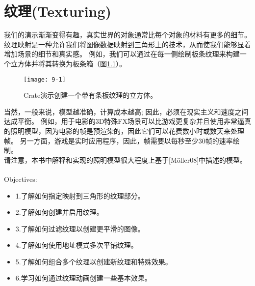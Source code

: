 \chapter{纹理(Texturing)}
\begin{flushleft}
我们的演示渐渐变得有趣，真实世界的对象通常比每个对象的材料有更多的细节。 纹理映射是一种允许我们将图像数据映射到三角形上的技术，从而使我们能够显着增加场景的细节和真实感。 例如，我们可以通过在每一侧绘制板条纹理来构建一个立方体并将其转换为板条箱（图\ref{fig:9-1}）。
\end{flushleft}

\begin{figure}[h]
    \texttt{[image: 9-1]}
    \centering
    \caption{Crate演示创建一个带有条板纹理的立方体。}
    \label{fig:9-1}
\end{figure}

\begin{flushleft}
当然，一般来说，模型越准确，计算成本越高; 因此，必须在现实主义和速度之间达成平衡。 例如，用于电影的3D特殊FX场景可以比游戏更复杂并且使用非常逼真的照明模型，因为电影的帧是预渲染的，因此它们可以花费数小时或数天来处理帧。 另一方面，游戏是实时应用程序，因此，帧需要以每秒至少30帧的速率绘制。\\
请注意，本书中解释和实现的照明模型很大程度上基于[Möller08]中描述的模型。\\
~\\
{\large Objectives:}
\begin{itemize}
    \item 1.了解如何指定映射到三角形的纹理部分。
    \item 2.了解如何创建并启用纹理。
    \item 3.了解如何过滤纹理以创建更平滑的图像。
    \item 4.了解如何使用地址模式多次平铺纹理。
    \item 5.了解如何组合多个纹理以创建新纹理和特殊效果。
    \item 6.学习如何通过纹理动画创建一些基本效果。
\end{itemize}
\end{flushleft}

